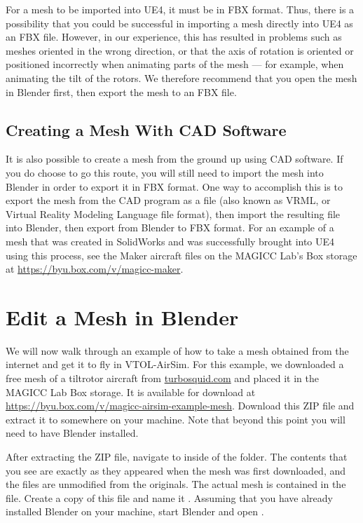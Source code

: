 For a mesh to be imported into UE4, it must be in FBX format. Thus, there is a possibility that you could be successful in importing a mesh directly into UE4 as an FBX file. However, in our experience, this has resulted in problems such as meshes oriented in the wrong direction, or that the axis of rotation is oriented or positioned incorrectly when animating parts of the mesh --- for example, when animating the tilt of the rotors. We therefore recommend that you open the mesh in Blender first, then export the mesh to an FBX file.

\subsection{Creating a Mesh With CAD Software}
It is also possible to create a mesh from the ground up using CAD software. If you do choose to go this route, you will still need to import the mesh into Blender in order to export it in FBX format. One way to accomplish this is to export the mesh from the CAD program as a  file (also known as VRML, or Virtual Reality Modeling Language file format), then import the resulting  file into Blender, then export from Blender to FBX format. For an example of a mesh that was created in SolidWorks and was successfully brought into UE4 using this process, see the Maker aircraft files on the MAGICC Lab's Box storage at \url{https://byu.box.com/v/magicc-maker}.

\section{Edit a Mesh in Blender}\label{sec:blender_example}

We will now walk through an example of how to take a mesh obtained from the internet and get it to fly in VTOL-AirSim. For this example, we downloaded a free mesh of a tiltrotor aircraft from \url{turbosquid.com} and placed it in the MAGICC Lab Box storage. It is available for download at \url{https://byu.box.com/v/magicc-airsim-example-mesh}. Download this ZIP file and extract it to somewhere on your machine. Note that beyond this point you will need to have Blender installed.

After extracting the ZIP file, navigate to inside of the  folder. The contents that you see are exactly as they appeared when the mesh was first downloaded, and the files are unmodified from the originals. The actual mesh is contained in the  file. Create a copy of this file and name it . Assuming that you have already installed Blender on your machine, start Blender and open .

